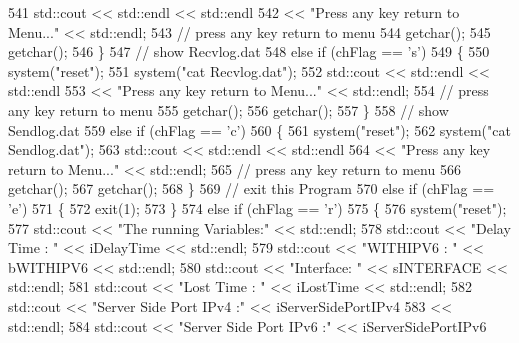 \begin{DoxyCode}
541             std::cout << std::endl << std::endl
542                     << \textcolor{stringliteral}{"Press any key return to Menu..."} << std::endl;
543             \textcolor{comment}{// press any key return to menu}
544             getchar();
545             getchar();
546         \}
547         \textcolor{comment}{// show Recvlog.dat}
548         \textcolor{keywordflow}{else} \textcolor{keywordflow}{if} (chFlag == \textcolor{charliteral}{'s'})
549         \{
550             system(\textcolor{stringliteral}{"reset"});
551             system(\textcolor{stringliteral}{"cat Recvlog.dat"});
552             std::cout << std::endl << std::endl
553                     << \textcolor{stringliteral}{"Press any key return to Menu..."} << std::endl;
554             \textcolor{comment}{// press any key return to menu}
555             getchar();
556             getchar();
557         \}
558         \textcolor{comment}{// show Sendlog.dat}
559         \textcolor{keywordflow}{else} \textcolor{keywordflow}{if} (chFlag == \textcolor{charliteral}{'c'})
560         \{
561             system(\textcolor{stringliteral}{"reset"});
562             system(\textcolor{stringliteral}{"cat Sendlog.dat"});
563             std::cout << std::endl << std::endl
564                     << \textcolor{stringliteral}{"Press any key return to Menu..."} << std::endl;
565             \textcolor{comment}{// press any key return to menu}
566             getchar();
567             getchar();
568         \}
569         \textcolor{comment}{// exit this Program}
570         \textcolor{keywordflow}{else} \textcolor{keywordflow}{if} (chFlag == \textcolor{charliteral}{'e'})
571         \{
572             exit(1);
573         \}
574         \textcolor{keywordflow}{else} \textcolor{keywordflow}{if} (chFlag == \textcolor{charliteral}{'r'})
575         \{
576             system(\textcolor{stringliteral}{"reset"});
577             std::cout << \textcolor{stringliteral}{"The running Variables:"} << std::endl;
578             std::cout << \textcolor{stringliteral}{"Delay Time : "} << iDelayTime << std::endl;
579             std::cout << \textcolor{stringliteral}{"WITHIPV6 : "} << bWITHIPV6 << std::endl;
580             std::cout << \textcolor{stringliteral}{"Interface: "} << sINTERFACE << std::endl;
581             std::cout << \textcolor{stringliteral}{"Lost Time : "} << iLostTime << std::endl;
582             std::cout << \textcolor{stringliteral}{"Server Side Port IPv4 :"} << iServerSidePortIPv4
583                     << std::endl;
584             std::cout << \textcolor{stringliteral}{"Server Side Port IPv6 :"} << iServerSidePortIPv6

\end{DoxyCode}
